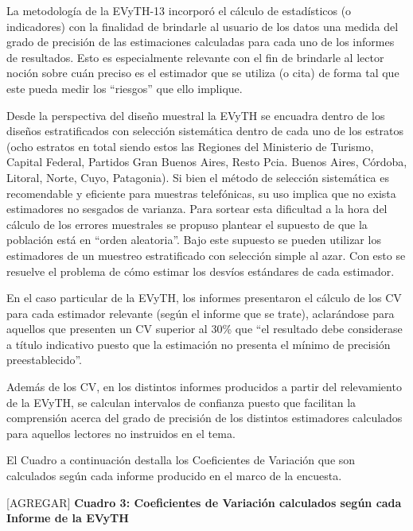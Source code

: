 \documentclass[
  openany]{book}
\begin{document}
La metodología de la EVyTH-13 incorporó el cálculo de estadísticos (o indicadores) con la finalidad de brindarle al usuario de los datos una medida del grado de precisión de las estimaciones calculadas para cada uno de los informes de resultados. Esto es especialmente relevante con el fin de brindarle al lector noción sobre cuán preciso es el estimador que se utiliza (o cita) de forma tal que este pueda medir los ``riesgos'' que ello implique.

Desde la perspectiva del diseño muestral la EVyTH se encuadra dentro de los diseños estratificados con selección sistemática dentro de cada uno de los estratos (ocho estratos en total siendo estos las Regiones del Ministerio de Turismo, Capital Federal, Partidos Gran Buenos Aires, Resto Pcia. Buenos Aires, Córdoba, Litoral, Norte, Cuyo, Patagonia). Si bien el método de selección sistemática es recomendable y eficiente para muestras telefónicas, su uso implica que no exista estimadores no sesgados de varianza. Para sortear esta dificultad a la hora del cálculo de los errores muestrales se propuso plantear el supuesto de que la población está en ``orden aleatoria''. Bajo este supuesto se pueden utilizar los estimadores de un muestreo estratificado con selección simple al azar. Con esto se resuelve el problema de cómo estimar los desvíos estándares de cada estimador.

En el caso particular de la EVyTH, los informes presentaron el cálculo de los CV para cada estimador relevante (según el informe que se trate), aclarándose para aquellos que presenten un CV superior al 30\% que ``el resultado debe considerase a título indicativo puesto que la estimación no presenta el mínimo de precisión preestablecido''.

Además de los CV, en los distintos informes producidos a partir del relevamiento de la EVyTH, se calculan intervalos de confianza puesto que facilitan la comprensión acerca del grado de precisión de los distintos estimadores calculados para aquellos lectores no instruidos en el tema.

El Cuadro a continuación destalla los Coeficientes de Variación que son calculados según cada informe producido en el marco de la encuesta.

{[}AGREGAR{]} \textbf{Cuadro 3: Coeficientes de Variación calculados según cada Informe de la EVyTH}
\end{document}
